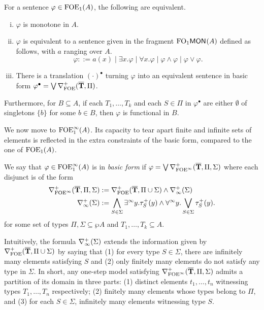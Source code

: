 \begin{theorem}\label{cor:ofoeicontinuousnf} For a sentence $\varphi \in \mathrm{FOE}_1(A)$, the following are equivalent.
\begin{enumerate}[(i)]
\item $\varphi$ is monotone in $A$.
\item $\varphi$ is equivalent to a sentence given in the fragment $\mathrm{FO}_1\mathsf{MON}_{}(A)$ defined as follows, with $a$ ranging over $A$.
\[
\varphi ::= a(x) \mid \exists x.\varphi \mid \forall x.\varphi \mid \varphi \land \varphi \mid \varphi \lor \varphi.
\]
\item There is a translation $(\cdot)^{\bullet}$ turning $\varphi$ into an equivalent sentence in basic form $\varphi^{\bullet} = \bigvee \nabla^+_{\mathrm{FOE}}(\overline{{\mathbf{T}}},\Pi)$.
\end{enumerate}
Furthermore, for $B \subseteq A$, if each $T_1, \dots, T_k$ and each $S \in \Pi$ in $\varphi^{\bullet}$ are either $\emptyset$ of singletons $\{b\}$ for some $b \in B$, then $\varphi$ is functional in $B$.
\end{theorem}



We now move to $\mathrm{FOE}^{\infty}_1(A)$. Its capacity to tear apart finite and infinite sets of elements is reflected in the extra constraints of the basic form, compared to the one of $\mathrm{FOE}_1(A)$.

\begin{definition}
We say that $\varphi \in \mathrm{FOE}^{\infty}_1(A)$ is in \emph{basic form} if $\varphi = \bigvee \nabla^+_{\mathrm{FOE}^{\infty}}(\overline{{\mathbf{T}}},\Pi,\Sigma)$ where each disjunct is of the form
\begin{align*}
	\nabla^+_{\mathrm{FOE}^{\infty}}(\overline{{\mathbf{T}}},\Pi,\Sigma) &:= \nabla^+_{\mathrm{FOE}}(\overline{{\mathbf{T}}},\Pi \cup \Sigma) \land \nabla^+_\infty(\Sigma)\\
	\nabla^+_\infty(\Sigma) &:= \bigwedge_{S\in\Sigma} \exists^\infty y.\tau^{+}_S(y) \land \forall^\infty y.\bigvee_{S\in\Sigma} \tau^{+}_S(y) .
\end{align*}
for some set of types $\Pi,\Sigma \subseteq \wp A$ and $T_1, \dots, T_k \subseteq A$.
\end{definition}

Intuitively, the formula $\nabla^+_\infty(\Sigma)$ extends the information given by $\nabla^+_{\mathrm{FOE}}(\overline{{\mathbf{T}}},\Pi \cup \Sigma)$ by saying that (1) for every type $S\in\Sigma$, there are infinitely many elements satisfying $S$ and (2) only finitely many elements do not satisfy any type in $\Sigma$. In short, any one-step model satisfying $\nabla^+_{\mathrm{FOE}^{\infty}}(\overline{{\mathbf{T}}},\Pi,\Sigma)$ admits a partition of its domain in three parts: (1) distinct elements $t_1,\dots,t_n$ witnessing types $T_1,\dots,T_n$ respectively; (2) finitely many elements whose types belong to $\Pi$, and (3) for each $S\in \Sigma$, infinitely many elements witnessing type $S$.

